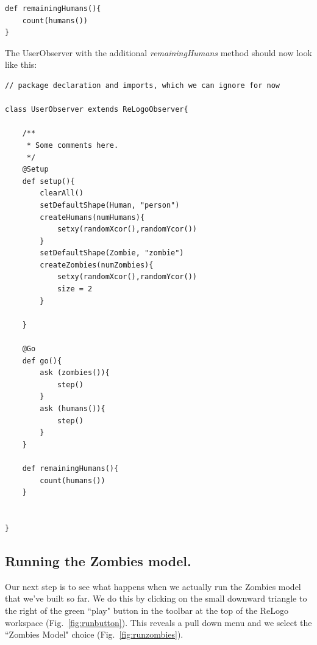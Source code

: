 \documentclass[11pt]{amsart}
\begin{document}
\noindent\begin{minipage}[h]{\textwidth}
\vspace{.2in}
\begin{lstlisting}
def remainingHumans(){
	count(humans())
}
\end{lstlisting}
\vspace{.2in}
\end{minipage}

The UserObserver with the additional \emph{remainingHumans} method should now look like this:

\noindent\begin{minipage}[h]{\textwidth}
\vspace{.2in}
\lstset{language=java,caption=The UserObserver class.,label=lst:observer2}
\begin{lstlisting}
// package declaration and imports, which we can ignore for now

class UserObserver extends ReLogoObserver{

	/**
	 * Some comments here.
	 */
	@Setup
	def setup(){
		clearAll()
		setDefaultShape(Human, "person")
		createHumans(numHumans){
			setxy(randomXcor(),randomYcor())
		}
		setDefaultShape(Zombie, "zombie")
		createZombies(numZombies){
			setxy(randomXcor(),randomYcor())
			size = 2
		}
		
	}
	
	@Go
	def go(){
		ask (zombies()){
			step()
		}
		ask (humans()){
			step()
		}
	}
	
	def remainingHumans(){
		count(humans())
	}

	
}
\end{lstlisting}
\vspace{.2in}
\end{minipage}

\subsection{Running the Zombies model.}
Our next step is to see what happens when we actually run the Zombies model that we've built so far. We do this by clicking on the small downward triangle to the right of the green ``play" button in the toolbar at the top of the ReLogo workspace (Fig.~\ref{fig:runbutton}). This reveals a pull down menu and we select the ``Zombies Model" choice (Fig.~\ref{fig:runzombies}).
\end{document}
